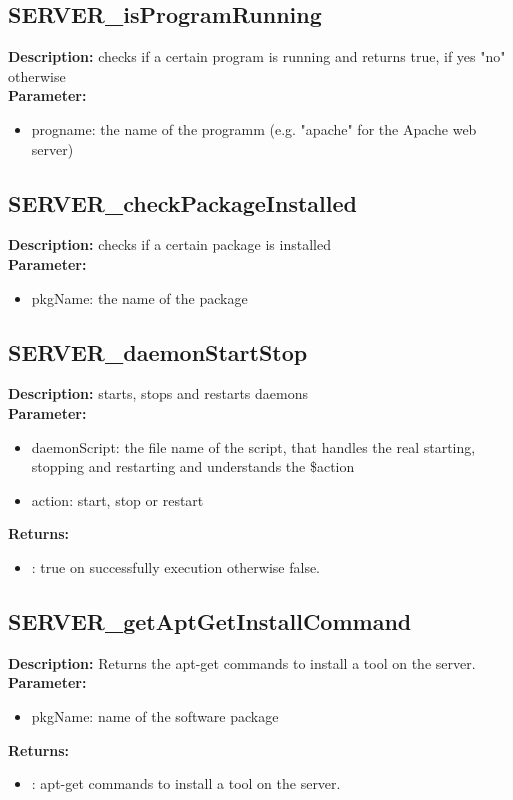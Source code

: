 \subsection{SERVER\_isProgramRunning}
\textbf{Description:} checks if a certain program is running and returns true, if yes "no" otherwise\\
\textbf{Parameter:}
\begin{itemize}
\item progname: the name of the programm (e.g. "apache" for the Apache web server)
\end{itemize}

\subsection{SERVER\_checkPackageInstalled}
\textbf{Description:} checks if a certain package is installed\\
\textbf{Parameter:}
\begin{itemize}
\item pkgName: the name of the package
\end{itemize}

\subsection{SERVER\_daemonStartStop}
\textbf{Description:} starts, stops and restarts daemons\\
\textbf{Parameter:}
\begin{itemize}
\item daemonScript: the file name of the script, that handles the real starting, stopping and restarting and understands the \$action
\item action: start, stop or restart
\end{itemize}
\textbf{Returns:}
\begin{itemize}
\item : true on successfully execution otherwise false.
\end{itemize}

\subsection{SERVER\_getAptGetInstallCommand}
\textbf{Description:} Returns the apt-get commands to install a tool on the server.\\
\textbf{Parameter:}
\begin{itemize}
\item pkgName: name of the software package
\end{itemize}
\textbf{Returns:}
\begin{itemize}
\item : apt-get commands to install a tool on the server.
\end{itemize}


